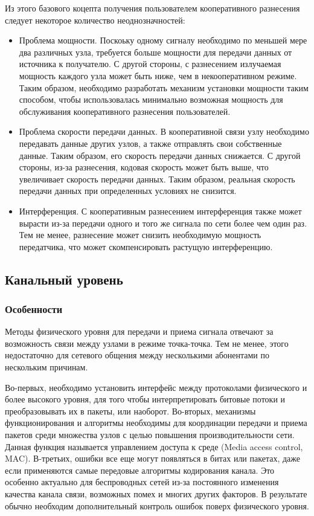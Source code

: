 \documentclass[14pt,a4paper,titlepage]{extarticle}
\begin{document}
Из этого базового коцепта получения пользователем кооперативного разнесения следует некоторое количество неоднозначностей:
\begin{itemize}
\item Проблема мощности. Поскоьку одному сигналу необходимо по меньшей мере два различных узла, требуется больше мощности для передачи данных от источника к получателю. С другой стороны, с разнесением излучаемая мощность каждого узла может быть ниже, чем в некооперативном режиме. Таким образом, необходимо разработать механизм установки мощности таким способом, чтобы использовалась минимально возможная мощность для обслуживания кооперативного разнесения пользователей.

\item Проблема скорости передачи данных. В кооперативной связи узлу необходимо передавать данные других узлов, а также отправлять свои собственные данные. Таким образом, его скорость передачи данных снижается. С другой стороны, из-за разнесения, кодовая скорость может быть выше, что увеличивает скорость передачи данных. Таким образом, реальная скорость передачи данных при определенных условиях не снизится.

\item Интерференция. С кооперативным разнесением интерференция также может вырасти из-за передачи одного и того же сигнала по сети более чем один раз. Тем не менее, разнесение может снизить необходимую мощность передатчика, что может скомпенсировать растущую интерференцию.
\end{itemize}

\subsection{Канальный уровень}
\subsubsection{Особенности}
Методы физического уровня для передачи и приема сигнала отвечают за возможность связи между узлами в режиме точка-точка. Тем не менее, этого недостаточно для сетевого общения между несколькими абонентами по нескольким причинам.

Во-первых, необходимо установить интерфейс между протоколами физического и более высокого уровня, для того чтобы интерпретировать битовые потоки и преобразовывать их в пакеты, или наоборот. Во-вторых, механизмы функционирования и алгоритмы необходимы для координации передачи и приема пакетов среди множества узлов с целью повышения производительности сети. Данная функция называется управлением доступа к среде (Media access control, MAC). В-третьих, ошибки все еще могут появляться в битах или пакетах, даже если применяются самые передовые алгоритмы кодирования канала. Это особенно актуально для беспроводных сетей из-за постоянного изменения качества канала связи, возможных помех и многих других факторов. В результате обычно необходим дополнительный контроль ошибок поверх физического уровня.
\end{document}

